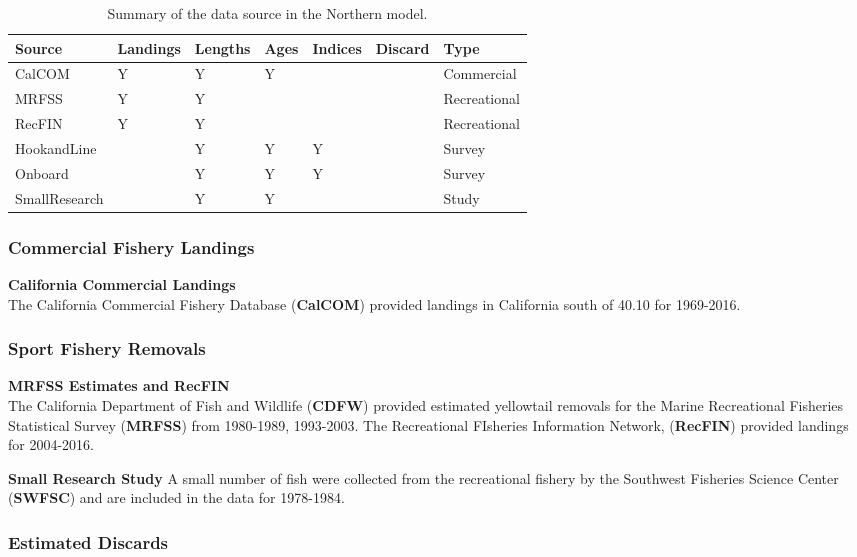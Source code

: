 \documentclass[12pt,]{article}
\begin{document}
\begin{table}[ht]
\centering
\caption{Summary of the data source in the Northern model.} 
\label{tab:Data_sources}
\begin{tabular}{lllllll}
  \hline
Source & Landings & Lengths & Ages & Indices & Discard & Type \\ 
  \hline
CalCOM & Y & Y & Y &  &  & Commercial \\ 
  MRFSS & Y & Y &  &  &  & Recreational \\ 
  RecFIN & Y & Y &  &  &  & Recreational \\ 
  HookandLine &  & Y & Y & Y &  & Survey \\ 
  Onboard &  & Y & Y & Y &  & Survey \\ 
  SmallResearch &  & Y & Y &  &  & Study \\ 
   \hline
\end{tabular}
\end{table}

\subsubsection{Commercial Fishery
Landings}\label{commercial-fishery-landings-1}

\textbf{California Commercial Landings}\\
The California Commercial Fishery Database (\textbf{CalCOM}) provided
landings in California south of 40.10 for 1969-2016.

\subsubsection{Sport Fishery Removals}\label{sport-fishery-removals-1}

\textbf{MRFSS Estimates and RecFIN}\\
The California Department of Fish and Wildlife (\textbf{CDFW}) provided
estimated yellowtail removals for the Marine Recreational Fisheries
Statistical Survey (\textbf{MRFSS}) from 1980-1989, 1993-2003. The
Recreational FIsheries Information Network, (\textbf{RecFIN}) provided
landings for 2004-2016.

\textbf{Small Research Study} A small number of fish were collected from
the recreational fishery by the Southwest Fisheries Science Center
(\textbf{SWFSC}) and are included in the data for 1978-1984.

\subsubsection{Estimated Discards}\label{estimated-discards-1}
\end{document}

